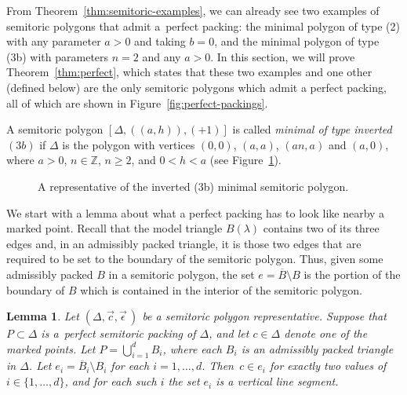 \documentclass[pdftex]{sigma}
\numberwithin{equation}{section}
\newtheorem{Lemma}[Theorem]{Lemma}
\def\Z{{\mathbb Z}}
\newcommand{\De}{\Delta}
\newcommand{\strep}{(\De,\vec{c},\vec{\epsilon}\,)}
\begin{document}
From Theorem~\ref{thm:semitoric-examples}, we can already see two examples of semitoric polygons that admit a~perfect packing: the minimal polygon of type (2) with any parameter $a>0$ and taking $b=0$, and the minimal polygon of type (3b) with parameters $n=2$ and any $a>0$.
In this section, we will prove Theorem~\ref{thm:perfect}, which states that these two examples and one other (defined below) are the only semitoric polygons which admit a perfect packing, all of which are shown in Figure~\ref{fig:perfect-packings}.

\begin{Definition}\label{def:inverted-3b}
 A semitoric polygon $[\De,((a,h)),(+1)]$ is called \emph{minimal of type inverted $(3b)$} if $\De$ is the polygon with vertices $(0,0)$, $(a,a)$, $(an, a)$ and $(a,0)$,
 where $a>0$, $n\in\Z$, $n\geq 2$, and $0<h<a$ (see Figure~\ref{fig:inverted3b}).
\end{Definition}
\begin{figure}[t]
 \centering
 \caption{A representative of the inverted (3b) minimal semitoric polygon.}
 \label{fig:inverted3b}
\end{figure}


We start with a lemma about what a perfect packing has to look like nearby a marked point.
Recall that the model triangle $B(\lambda)$ contains two of its three edges and, in an admissibly packed triangle, it is those two edges that are required to be set to the boundary of the semitoric polygon. Thus, given some admissibly packed $B$ in a semitoric polygon, the set $e = \overline{B}\setminus B$ is the portion of the boundary of $B$ which is contained in the interior of the semitoric polygon.

\begin{Lemma}\label{lem:perfect-local}
 Let $\strep$ be a semitoric polygon representative.
 Suppose that $P\subset \De$ is a~perfect semitoric packing of $\De$, and let $c\in\De$ denote one of the marked points.
 Let $P = \bigcup_{i=1}^d B_i$, where each $B_i$ is an admissibly packed triangle in $\De$.
 Let $e_i = \overline{B}_i\setminus B_i$ for each $i=1,\ldots, d$.
 Then~$c\in e_i$ for exactly two values of $i\in\{1,\ldots,d\}$, and
for each such $i$ the set $e_i$ is a vertical line segment.
\end{Lemma}
\end{document}
